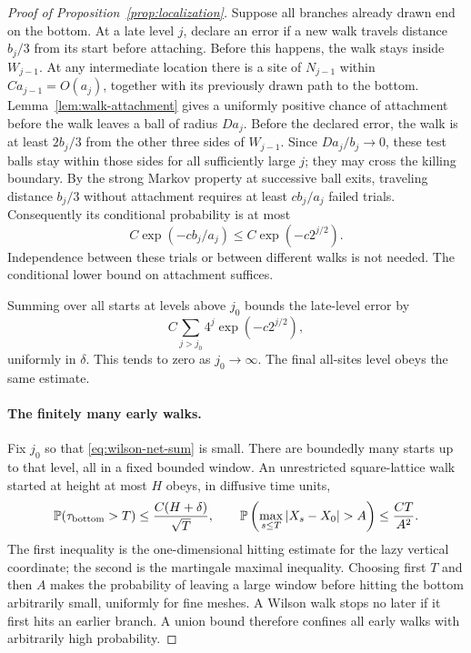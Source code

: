 \begin{proof}[Proof of Proposition~\ref{prop:localization}]
Suppose all branches already drawn end on the bottom.  At a late level
$j$, declare an error if a new walk travels distance $b_j/3$ from its
start before attaching.  Before this happens, the walk stays inside
$W_{j-1}$.  At any intermediate location there is a site of $N_{j-1}$
within $Ca_{j-1}=O(a_j)$, together with its previously drawn path to the
bottom.  Lemma~\ref{lem:walk-attachment} gives a uniformly positive
chance of attachment before the walk leaves a ball of radius $Da_j$.
Before the declared error, the walk is at least $2b_j/3$ from the
other three sides of $W_{j-1}$. Since $Da_j/b_j\to0$, these test balls
stay within those sides for all sufficiently large $j$; they may
cross the killing boundary.
By the strong Markov property at successive ball exits,
traveling distance $b_j/3$ without attachment requires at least
$cb_j/a_j$ failed trials.  Consequently its conditional probability is
at most
\begin{equation}
 C\exp(-c b_j/a_j)\le C\exp(-c2^{j/2}).
 \label{eq:wilson-net-tail}
\end{equation}
Independence between these trials or between different walks is not
needed.  The conditional lower bound on attachment suffices.

Summing over all starts at levels above $j_0$ bounds the late-level
error by
\begin{equation}
 C\sum_{j>j_0}4^j\exp(-c2^{j/2}),
 \label{eq:wilson-net-sum}
\end{equation}
uniformly in $\delta$.  This tends to zero as $j_0\to\infty$.
The final all-sites level obeys the same estimate.

\paragraph{The finitely many early walks.}
Fix $j_0$ so that \eqref{eq:wilson-net-sum} is small.  There are boundedly
many starts up to that level, all in a fixed bounded window.  An
unrestricted square-lattice walk started at height at most $H$ obeys,
in diffusive time units,
\[
 \PP(\tau_{\mathrm{bottom}}>T)
 \le \frac{C(H+\delta)}{\sqrt T},
 \qquad
 \PP\left(\max_{s\le T}|X_s-X_0|>A\right)
 \le \frac{CT}{A^2}.
\]
The first inequality is the one-dimensional hitting estimate for the
lazy vertical coordinate; the second is the martingale maximal
inequality.  Choosing first $T$ and then $A$ makes the probability of
leaving a large window before hitting the bottom arbitrarily small,
uniformly for fine meshes.  A Wilson walk stops no later if it first
hits an earlier branch.  A union bound therefore confines all early
walks with arbitrarily high probability.


\end{proof}
